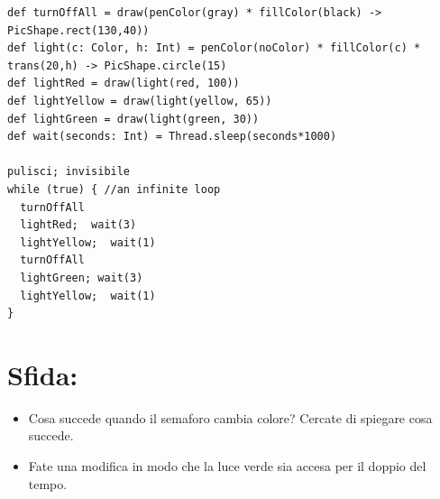 \begin{lstlisting}[basicstyle={\ttfamily\fontsize{14}{17}\selectfont},numbers=none]
def turnOffAll = draw(penColor(gray) * fillColor(black) -> PicShape.rect(130,40))
def light(c: Color, h: Int) = penColor(noColor) * fillColor(c) * trans(20,h) -> PicShape.circle(15)
def lightRed = draw(light(red, 100))
def lightYellow = draw(light(yellow, 65))
def lightGreen = draw(light(green, 30))
def wait(seconds: Int) = Thread.sleep(seconds*1000)

pulisci; invisibile  
while (true) { //an infinite loop
  turnOffAll
  lightRed;  wait(3)
  lightYellow;  wait(1) 
  turnOffAll
  lightGreen; wait(3)
  lightYellow;  wait(1)
}
\end{lstlisting}
        
\section*{\color{BrickRed}Sfida:}


\begin{itemize}

\item {Cosa succede quando il semaforo cambia colore? Cercate di spiegare cosa succede.}
\item {Fate una modifica in modo che la luce verde sia accesa per il doppio del tempo.}

\end{itemize}


